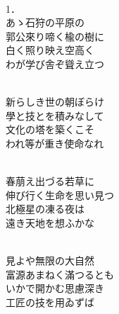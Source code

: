 \documentclass[10pt,b5j]{tarticle} %
\begin{document}
\vspace{1.5em} %
\newcommand{\linespace}{0.5em} %
\newcommand{\blocksize}{0.5\hsize} %
\newcommand{\itemmargin}{3em} %
\begin{enumerate} %
    \setlength{\itemindent}{\itemmargin} %
    \begin{minipage}[c]{\blocksize}
    
        \vspace{\linespace}
        \item~\\
        1．\\
        あゝ石狩の平原の\\
        郭公來り啼く楡の樹に\\
        白く照り映え空高く\\
        わが学び舎ぞ聳え立つ
        
    \end{minipage}
    \begin{minipage}[c]{\blocksize}
        
        \vspace{\linespace}
        \item~\\
        新らしき世の朝ぼらけ\\
        學と技とを積みなして\\
        文化の塔を築くこそ\\
        われ等が重き使命なれ
        
    \end{minipage}
    \begin{minipage}[c]{\blocksize}
        
        \vspace{\linespace}
        \item~\\
        春萠え出づる若草に\\
        伸び行く生命を思い見つ\\
        北極星の凍る夜は\\
        遠き天地を想ふかな
        
    \end{minipage}
    \begin{minipage}[c]{\blocksize}
        
        \vspace{\linespace}
        \item~\\
        見よや無限の大自然\\
        富源あまねく滿つるとも\\
        いかで開かむ思慮深き\\
        工匠の技を用ゐずば
        

\end{minipage}
\end{enumerate}
\end{document}
